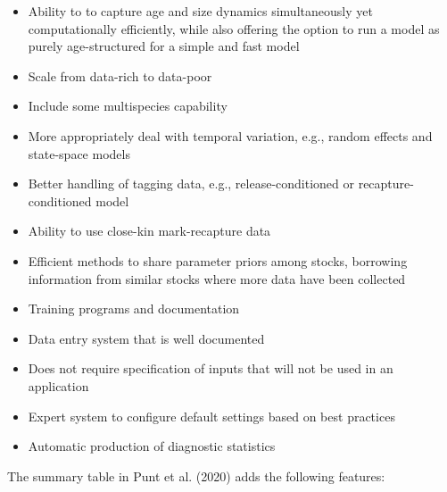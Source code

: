 \documentclass{SCreport}
\begin{document}
\begin{itemize}
  \item Ability to to capture age and size dynamics simultaneously yet
  computationally efficiently, while also offering the option to run a model as
  purely age-structured for a simple and fast model
  \item Scale from data-rich to data-poor
  \item Include some multispecies capability
  \item More appropriately deal with temporal variation, e.g., random effects
  and state-space models
  \item Better handling of tagging data, e.g., release-conditioned or
  recapture-conditioned model
  \item Ability to use close-kin mark-recapture data
  \item Efficient methods to share parameter priors among stocks, borrowing
  information from similar stocks where more data have been collected
  \item Training programs and documentation
  \item Data entry system that is well documented
  \item Does not require specification of inputs that will not be used in an
  application
  \item Expert system to configure default settings based on best practices
  \item Automatic production of diagnostic statistics
\end{itemize}

\vspace{2ex}

The summary table in Punt et al. (2020) adds the following features:
\end{document}
